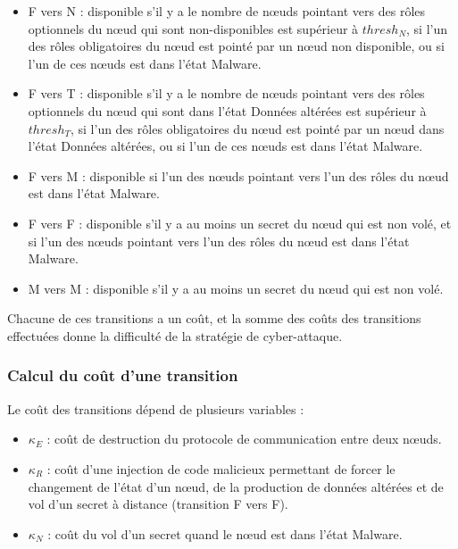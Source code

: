 \documentclass[a4paper]{article}
\begin{document}
    \begin{itemize}
        \item F vers N : disponible s'il y a le nombre de n\oe uds pointant vers des rôles optionnels du n\oe ud qui sont non-disponibles est supérieur à $thresh_N$, si l'un des rôles obligatoires du n\oe ud est pointé par un n\oe ud non disponible, ou si l'un de ces n\oe uds est dans l'état Malware.
        \item F vers T : disponible s'il y a le nombre de n\oe uds pointant vers des rôles optionnels du n\oe ud qui sont dans l'état Données altérées est supérieur à $thresh_T$, si l'un des rôles obligatoires du n\oe ud est pointé par un n\oe ud dans l'état Données altérées, ou si l'un de ces n\oe uds est dans l'état Malware.
        \item F vers M : disponible si l'un des n\oe uds pointant vers l'un des rôles du n\oe ud est dans l'état Malware.
        \item F vers F : disponible s'il y a au moins un secret du n\oe ud qui est non volé, et si l'un des n\oe uds pointant vers l'un des rôles du n\oe ud est dans l'état Malware.
        \item M vers M : disponible s'il y a au moins un secret du n\oe ud qui est non volé.
    \end{itemize}

    Chacune de ces transitions a un coût, et la somme des coûts des transitions effectuées donne la difficulté de la stratégie de cyber-attaque.

    \subsubsection{Calcul du coût d'une transition}

    Le coût des transitions dépend de plusieurs variables :
    
    \begin{itemize}
        \item $\kappa_E$ : coût de destruction du protocole de communication entre deux n\oe uds.
        \item $\kappa_R$ : coût d'une injection de code malicieux permettant de forcer le changement de l'état d'un n\oe ud, de la production de données altérées et de vol d'un secret à distance (transition F vers F).
        \item $\kappa_N$ : coût du vol d'un secret quand le n\oe ud est dans l'état Malware.
    \end{itemize}
\end{document}
